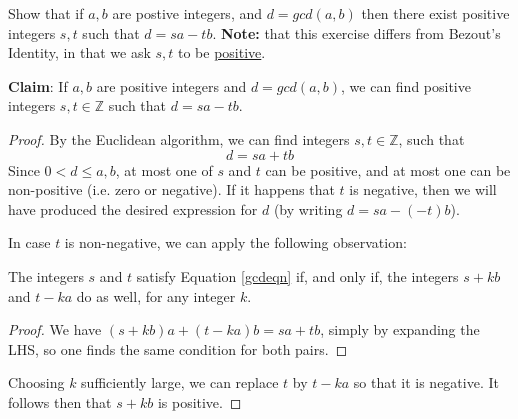 \documentclass[11pt,dvipsnames]{book}
\numberwithin{equation}{section} %
\numberwithin{figure}{section} %
\numberwithin{table}{section} %
\begin{document}
\begin{exercise}
Show that if $a, b$ are postive integers, and $d=gcd(a,b)$ then there exist positive integers $s, t$ such that $d=sa-tb$. {\bf Note:} that this exercise differs from Bezout’s  Identity, in that we ask $s, t$ to be \underline{positive}.


\begin{solution}
{\bf Claim}: If $a,b$ are positive integers and $d=gcd(a,b)$, we can find positive integers $s, t \in\mathbb{Z}$ such that $d=sa-tb$.

\begin{proof}  By the Euclidean algorithm, we can find integers $s,t\in\mathbb{Z}$, such that
\begin{equation}d=sa+tb\label{gcdeqn}\end{equation}
Since $0<d\leq a,b$, at most one of $s$ and $t$ can be positive, and at most one can be non-positive (i.e. zero or negative).  If it happens that $t$ is negative, then we will have produced the desired expression for $d$ (by writing $d=sa - (-t)b$).

In case $t$ is non-negative, we can apply the following observation:
\begin{lemma} The integers $s$ and $t$ satisfy Equation \eqref{gcdeqn} if, and only if, the integers $s+kb$ and $t-ka$ do as well, for any integer $k$.\end{lemma}
\begin{proof} We have $(s+kb)a + (t-ka)b = sa+tb$, simply by expanding the LHS, so one finds the same condition for both pairs.\end{proof}

Choosing $k$ sufficiently large, we can replace $t$ by $t-ka$ so that it is negative.  It follows then that $s+kb$ is positive.
\end{proof}

\end{solution}


\end{exercise}
\end{document}
